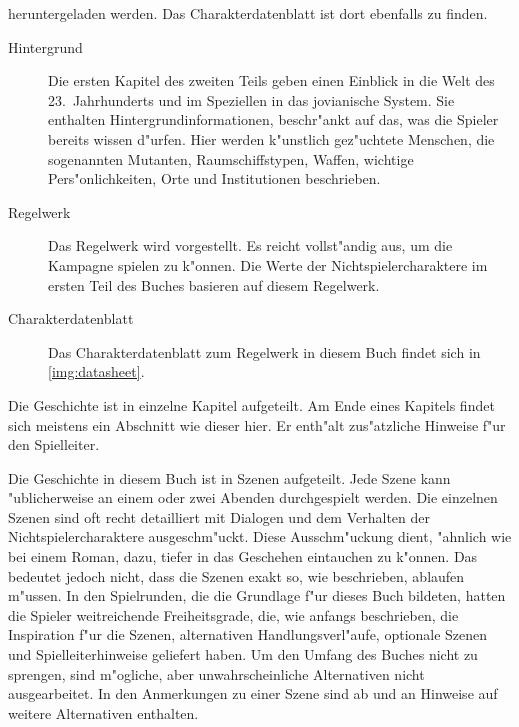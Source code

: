 \begin{description}
        heruntergeladen werden. Das Charakterdatenblatt ist dort ebenfalls zu finden.
        \begin{description}
            \item [Hintergrund] Die ersten Kapitel des zweiten Teils  geben einen Einblick in die Welt des 
                23.~Jahrhunderts und im Speziellen in das jovianische System. Sie enthalten Hintergrundinformationen, beschr"ankt auf das, was die Spieler bereits wissen d"urfen. Hier werden k"unstlich gez"uchtete Menschen, die sogenannten Mutanten, Raumschiffstypen, Waffen, wichtige Pers"onlichkeiten, Orte und Institutionen beschrieben.
            \item [Regelwerk] Das Regelwerk wird  vorgestellt. Es reicht vollst"andig aus, um die Kampagne 
                spielen zu k"onnen. Die Werte der Nichtspielercharaktere im ersten Teil des Buches basieren auf diesem Regelwerk.
            \item [Charakterdatenblatt] Das Charakterdatenblatt zum Regelwerk in diesem Buch findet sich in \cref{img:datasheet}.
        \end{description}        
\end{description}


\begin{remarks}
    Die Geschichte ist in einzelne Kapitel aufgeteilt. Am Ende eines Kapitels findet sich meistens ein Abschnitt wie dieser hier. Er enth"alt zus"atzliche Hinweise f"ur den Spielleiter.
\end{remarks}


Die Geschichte in diesem Buch ist in Szenen aufgeteilt. Jede Szene kann "ublicherweise an einem oder zwei Abenden durchgespielt werden. Die einzelnen Szenen sind oft recht detailliert mit Dialogen und dem Verhalten der Nichtspielercharaktere ausgeschm"uckt. Diese Ausschm"uckung dient, "ahnlich wie bei einem Roman, dazu, tiefer in das Geschehen eintauchen zu k"onnen. Das bedeutet jedoch nicht, dass die Szenen exakt so, wie beschrieben, ablaufen m"ussen. In den Spielrunden, die die Grundlage f"ur dieses Buch bildeten, hatten die Spieler weitreichende Freiheitsgrade, die, wie anfangs beschrieben, die Inspiration f"ur die Szenen, alternativen Handlungsverl"aufe, optionale Szenen und Spielleiterhinweise geliefert haben. Um den Umfang des Buches nicht zu sprengen, sind m"ogliche, aber unwahrscheinliche Alternativen nicht ausgearbeitet. In den Anmerkungen zu einer Szene sind ab und an Hinweise auf weitere Alternativen enthalten.

